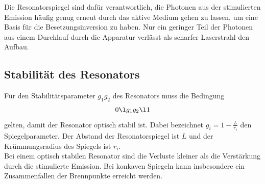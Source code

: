 Die Resonatorspiegel sind dafür verantwortlich, die Photonen aus der stimulierten Emission häufig genug erneut durch das aktive Medium gehen zu lassen, um eine Basis für die Besetzungsinversion zu haben. Nur ein geringer Teil der Photonen aus einem Durchlauf durch die Apparatur verlässt als scharfer Laserstrahl den Aufbau.

\subsection{Stabilität des Resonators}
\label{subsec:stabilitaetTheorie}
Für den Stabilitätsparameter $g_1 g_2$ des Resonators muss die Bedingung
\begin{equation}
  0 \l g_1 g_2 \l 1
  \label{eqn:stabilitaet}
\end{equation}
gelten, damit der Resonator optisch stabil ist. Dabei bezeichnet $g_i = 1 - \frac{L}{r_i}$ den Spiegelparameter. Der Abstand der Resonatorspiegel ist $L$ und der Krümmungsradius des Spiegels ist $r_i$.\\
Bei einem optisch stabilen Resonator sind die Verluste kleiner als die Verstärkung durch die stimulierte Emission. Bei konkaven Spiegeln kann insbesondere ein Zusammenfallen der Brennpunkte erreicht werden.
